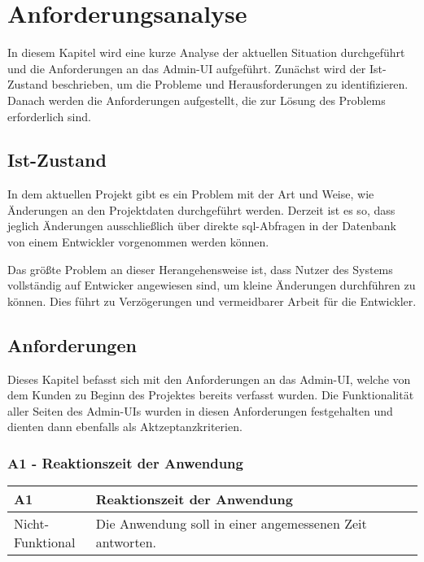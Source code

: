 \newpage
\section{Anforderungsanalyse}
In diesem Kapitel wird eine kurze Analyse der aktuellen Situation durchgeführt und die Anforderungen an das Admin-UI aufgeführt. Zunächst wird der Ist-Zustand beschrieben, um die Probleme und Herausforderungen zu identifizieren.
Danach werden die Anforderungen aufgestellt, die zur Lösung des Problems erforderlich sind.

\subsection[Ist-Zustand]{Ist-Zustand}
In dem aktuellen Projekt gibt es ein Problem mit der Art und Weise, wie Änderungen an den Projektdaten durchgeführt werden.
Derzeit ist es so, dass jeglich Änderungen ausschließlich über direkte \acs{sql}-Abfragen in der Datenbank von einem Entwickler vorgenommen werden können.

Das größte Problem an dieser Herangehensweise ist, dass Nutzer des Systems vollständig auf Entwicker angewiesen sind, um kleine Änderungen durchführen zu können.
Dies führt zu Verzögerungen und vermeidbarer Arbeit für die Entwickler.

\subsection[Anforderungen]{Anforderungen}
Dieses Kapitel befasst sich mit den Anforderungen an das Admin-UI, welche von dem Kunden zu Beginn des Projektes bereits verfasst wurden.
Die Funktionalität aller Seiten des Admin-UIs wurden in diesen Anforderungen festgehalten und dienten dann ebenfalls als Aktzeptanzkriterien.

\subsubsection[A1 - Reaktionszeit der Anwendung]{A1 - Reaktionszeit der Anwendung}

\begin{center}
    \begin{tabular}{ |p{0.2\linewidth}|p{0.8\linewidth}| } 
        \hline
        \rowcolor{lightgray}
        \textbf{A1} & \textbf{Reaktionszeit der Anwendung} \\
        \hline
        Nicht-Funktional &  Die Anwendung soll in einer angemessenen Zeit antworten.\\ 
        \hline
    \end{tabular}
\end{center}


